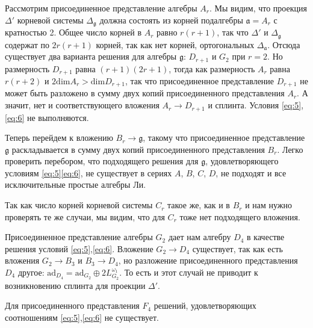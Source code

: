 \documentclass[12pt]{article}
\newcommand{\gf}{\mathfrak{g}}
\newcommand{\af}{\mathfrak{a}}
\begin{document}

Рассмотрим присоединенное представление алгебры $A_{r}$. Мы видим, что проекция $\Delta'$ корневой
системы $\Delta_{\gf}$ должна состоять из корней подалгебры $\af=A_{r}$ с кратностью 2. Общее число
корней в $A_{r}$ равно $r(r+1)$, так что $\Delta'$ и $\Delta_{\gf}$ содержат по $2r(r+1)$ корней,
так как нет корней, ортогональных $\Delta_{\af}$. Отсюда существует два варианта решения для алгебры
$\gf$: $D_{r+1}$ и $G_{2}$ при $r=2$. Но размерность $D_{r+1}$ равна $(r+1)(2r+1)$, тогда как
размерность $A_{r}$ равна $r(r+2)$ и $2\mathrm{dim}A_{r}>\mathrm{dim}D_{r+1}$, так что
присоединенное представление $D_{r+1}$ не может быть разложено в сумму двух копий присоединенного
представления $A_{r}$. А значит, нет и соответствующего вложения $A_{r}\to D_{r+1}$ и сплинта.
Условия \ref{eq:5},\ref{eq:6} не выполняются.

Теперь перейдем к вложению $B_{r}\to \gf$, такому что присоединенное представление $\gf$
раскладывается в сумму двух копий присоединенного представления $B_{r}$. Легко проверить перебором,
что подходящего решения для $\gf$, удовлетворяющего условиям \ref{eq:5}\ref{eq:6}, не существует в
сериях $A$, $B$, $C$, $D$, не подходят и все исключительные простые алгебры Ли.

Так как число корней корневой системы  $C_{r}$ такое же, как и в $B_{r}$ и нам нужно проверять те же
случаи, мы видим, что для  $C_{r}$ тоже нет подходящего вложения.

Присоединенное представление алгебры $G_{2}$ дает нам алгебру  $D_{4}$ в качестве решения условий
\ref{eq:5},\ref{eq:6}. Вложение  $G_{2}\to D_{4}$ существует, так как есть вложения $G_{2}\to B_{3}$
и $B_{3}\to D_{4}$, но разложение присоединенного представления $D_{4}$ другое: $
\mathrm{ad}_{D_{4}}=\mathrm{ad}_{G_{2}}\oplus 2 L^{\omega_{1}}_{G_{2}}$. То есть и этот случай не
приводит к возникновению сплинта для проекции $\Delta'$. 

Для присоединенного представления  $F_{4}$ решений, удовлетворяющих соотношениям
\ref{eq:5},\ref{eq:6} не существует.
\end{document}
